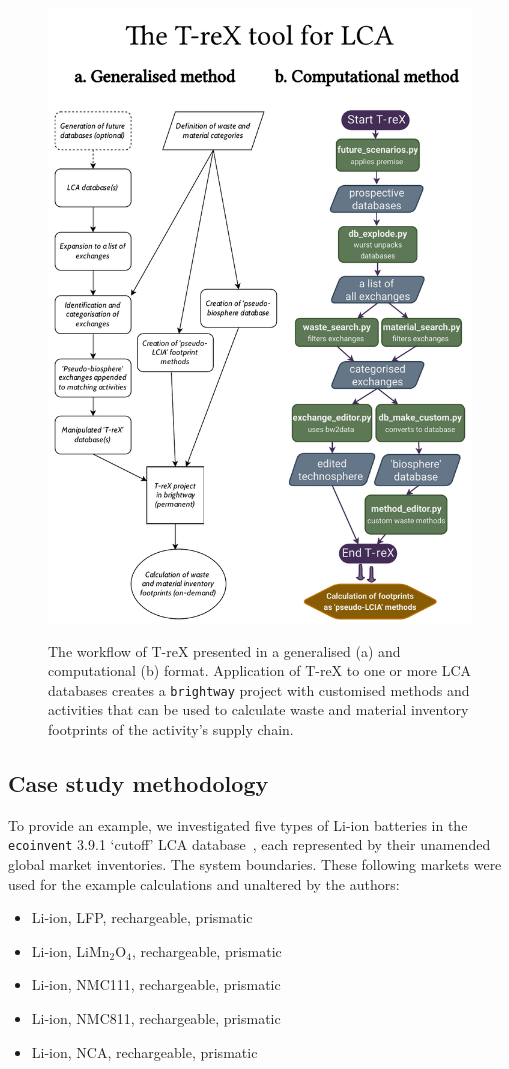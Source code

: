 \documentclass[a4paper,fleqn]{cas-dc}
\renewcommand{\texttt}[1]{{\ttfamily\small\nolinkurl{#1}}}
\begin{document}
\begin{figure}
	\centering
	\caption{The workflow of T-reX presented in a generalised (a) and computational (b) format. Application of T-reX to one or more LCA databases creates a \texttt{brightway} project with customised methods and activities that can be used to calculate waste and material inventory footprints of the activity's supply chain.}
	\includegraphics[width=0.9\columnwidth]{figures/T-reX_method.pdf}\label{fig:methods-flowchart}
\end{figure}

\subsection{Case study methodology}\label{sec:method-casestudy}

To provide an example, we investigated five types of Li-ion batteries in the
\texttt{ecoinvent} 3.9.1 `cutoff' LCA database~\citep{ecoinvent2016version3},
each represented by their unamended global market inventories. The system
boundaries. These following markets were used for the example calculations and
unaltered by the authors:
\begin{itemize}
	\itemsep=0pt
	\item Li-ion, LFP, rechargeable, prismatic
	\item Li-ion, LiMn\(_2\)O\(_4\), rechargeable, prismatic
	\item Li-ion, NMC111, rechargeable, prismatic
	\item Li-ion, NMC811, rechargeable, prismatic
	\item Li-ion, NCA, rechargeable, prismatic
\end{itemize}
\end{document}
